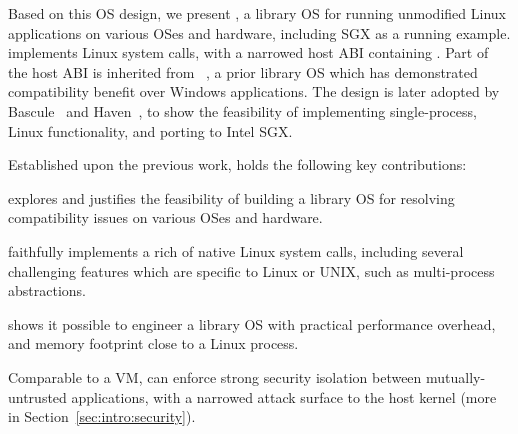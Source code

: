 Based on this OS design, we present {\bf \graphene{}}, a library OS for running unmodified Linux applications on various OSes and hardware, including SGX as a running example.
\graphene{} implements %
Linux system calls,
with a narrowed host ABI containing \palcallnum{} \hostapis{}.
Part of the host ABI is inherited from \drawbridge{}~\cite{porter11drawbridge}, a prior library OS which has demonstrated compatibility benefit over
Windows applications.
The \drawbridge{} design is later adopted by Bascule~\cite{baumann13bascule} and Haven~\cite{baumann14haven}, to show the feasibility of implementing single-process, Linux functionality, and porting to Intel SGX.


Established upon the previous work, \graphene{} holds the following key contributions:
\begin{compactenum}
\item \graphene{} explores and justifies the feasibility of building a library OS for resolving compatibility issues on various OSes and hardware.
\item \graphene{} faithfully implements a rich of native Linux system calls, including several challenging features which are specific to Linux or UNIX,
such as multi-process abstractions.
\item \graphene{} shows it possible to engineer a library OS
with practical performance overhead,
and memory footprint close to a Linux process.
\item Comparable to a VM, \graphene{} can enforce strong security isolation
between mutually-untrusted applications,
with a narrowed attack surface to the host kernel (more in Section~\ref{sec:intro:security}).
\end{compactenum}



